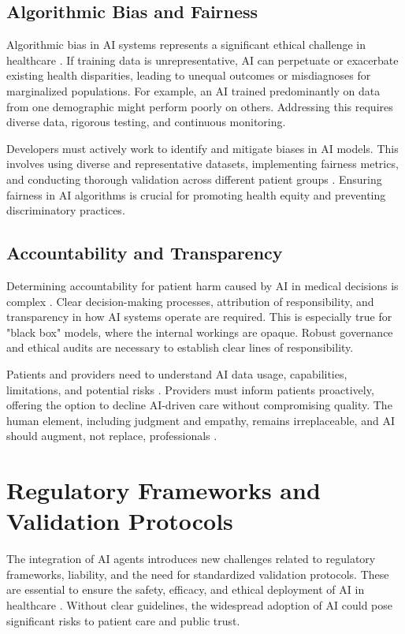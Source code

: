 \documentclass[12pt,a4paper]{article}
\begin{document}
\subsection{Algorithmic Bias and Fairness}
Algorithmic bias in AI systems represents a significant ethical challenge in healthcare \cite{tonic.ai}. If training data is unrepresentative, AI can perpetuate or exacerbate existing health disparities, leading to unequal outcomes or misdiagnoses for marginalized populations. For example, an AI trained predominantly on data from one demographic might perform poorly on others. Addressing this requires diverse data, rigorous testing, and continuous monitoring.

Developers must actively work to identify and mitigate biases in AI models. This involves using diverse and representative datasets, implementing fairness metrics, and conducting thorough validation across different patient groups \cite{shah2019artificial}. Ensuring fairness in AI algorithms is crucial for promoting health equity and preventing discriminatory practices.

\subsection{Accountability and Transparency}
Determining accountability for patient harm caused by AI in medical decisions is complex \cite{alation_data_catalog}. Clear decision-making processes, attribution of responsibility, and transparency in how AI systems operate are required. This is especially true for "black box" models, where the internal workings are opaque. Robust governance and ethical audits are necessary to establish clear lines of responsibility.

Patients and providers need to understand AI data usage, capabilities, limitations, and potential risks \cite{frontiersin}. Providers must inform patients proactively, offering the option to decline AI-driven care without compromising quality. The human element, including judgment and empathy, remains irreplaceable, and AI should augment, not replace, professionals \cite{hitrustalliance.net}.

\section{Regulatory Frameworks and Validation Protocols}
The integration of AI agents introduces new challenges related to regulatory frameworks, liability, and the need for standardized validation protocols. These are essential to ensure the safety, efficacy, and ethical deployment of AI in healthcare \cite{weforum.org}. Without clear guidelines, the widespread adoption of AI could pose significant risks to patient care and public trust.
\end{document}
